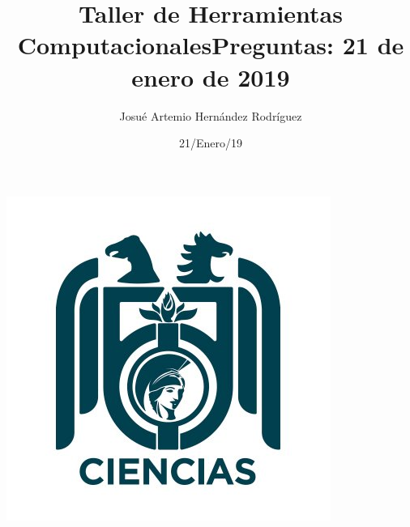 \documentclass[letterpaper, 12pt, oneside]{article}%
\title{\Huge Taller de Herramientas Computacionales}
\author{Josué Artemio Hernández Rodríguez}%
\date{21/Enero/19}%
\begin{document}
\maketitle
\begin{center}%
\includegraphics[scale=.6]{3.jpg}%
\end{center}%
\newpage%

\title{\huge Preguntas: 21 de enero de 2019\\}%
\end{document}
